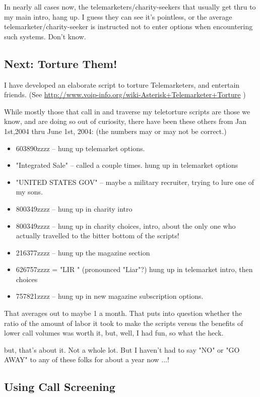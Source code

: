 In nearly all cases now, the telemarketers/charity-seekers that
usually get thru to my main intro, hang up. I guess they can see it's
pointless, or the average telemarketer/charity-seeker is instructed
not to enter options when encountering such systems. Don't know.


\subsection{Next: Torture Them!}

I have developed an elaborate script to torture Telemarketers, and
entertain friends. (See
\url{http://www.voip-info.org/wiki-Asterisk+Telemarketer+Torture} )

While mostly those that call in and traverse my teletorture scripts
are those we know, and are doing so out of curiosity, there have been
these others from Jan 1st,2004 thru June 1st, 2004:
(the numbers may or may not be correct.)

\begin{itemize}
    \item 603890zzzz -- hung up telemarket options.
    \item "Integrated Sale" -- called a couple times. hung up in telemarket options
    \item "UNITED STATES GOV" -- maybe a military recruiter, trying to lure one of my sons.
    \item 800349zzzz -- hung up in charity intro
    \item 800349zzzz -- hung up in charity choices, intro, about the only one who actually travelled to the bitter bottom of the scripts!
    \item 216377zzzz -- hung up the magazine section
    \item 626757zzzz = "LIR    " (pronounced "Liar"?) hung up in telemarket intro, then choices
    \item 757821zzzz -- hung up in new magazine subscription options.
\end{itemize}

That averages out to maybe 1 a month. That puts into question whether
the ratio of the amount of labor it took to make the scripts versus
the benefits of lower call volumes was worth it, but, well, I had fun,
so what the heck.

but, that's about it. Not a whole lot. But I haven't had to say "NO"
or "GO AWAY" to any of these folks for about a year now ...!

\subsection{Using Call Screening}

